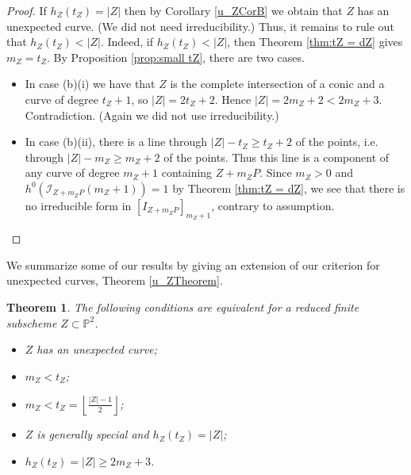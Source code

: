\documentclass[12pt]{amsart}
\numberwithin{equation}{section}
\newtheorem{theorem}{Theorem}[section]
\theoremstyle{definition}
\begin{document}
\begin{proof}
If $h_Z(t_Z) = |Z|$ then by Corollary \ref{u_ZCorB} we obtain that $Z$ has an unexpected curve. (We  did not need irreducibility.) 
Thus, it remains to rule out  that   $h_Z (t_Z) < |Z|$. Indeed, if $h_Z (t_Z) < |Z|$, then Theorem  \ref{thm:tZ = dZ} gives $m_Z = t_Z$.
By Proposition \ref{prop:small tZ}, there are two cases.  

\begin{itemize}

\item[-] In case (b)(i) we have that $Z$ is the complete intersection of a conic and a curve of degree $t_Z+1$, so $|Z| = 2t_Z+2$. Hence $|Z| = 2m_Z+2 < 2m_Z+3$. Contradiction. (Again we did not use irreducibility.)

\medskip

\item[-] In case (b)(ii), there is a line through $|Z|-t_Z \geq t_Z+2$ of the points, i.e. through $|Z| - m_Z \geq m_Z+2$ of the points. 
Thus this line is a component of any curve of degree $m_Z+1$ containing $Z + m_ZP$.
Since $m_Z>0$ and 
$h^0(\mathcal I_{Z+m_ZP}(m_Z+1))=1$ by Theorem \ref{thm:tZ = dZ}, 
we see that  there is no irreducible form
in $[I_{Z+m_ZP}]_{m_Z+1}$, contrary to assumption. 
\end{itemize} 
\end{proof}

We summarize some of our results by giving an extension of our criterion for unexpected curves, Theorem \ref{u_ZTheorem}.

\begin{theorem} \label{criterion}
The following conditions are equivalent for a reduced finite subscheme  $Z \subset \mathbb P^2$.

\begin{itemize}
\item[(a)] $Z$ has an unexpected curve;

\item[(b)] $m_Z < t_Z$;

\item[(c)] $m_Z < t_Z = \left \lfloor \frac{|Z| -1}{2} \right \rfloor$;

\item[(d)] $Z$ is generally special and $h_Z(t_Z) = |Z|$;

\item[(e)] $h_Z (t_Z) = |Z| \geq 2m_Z +3$.

\end{itemize}

\end{theorem}
\end{document}
